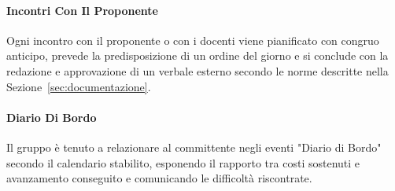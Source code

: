 \paragraph{Incontri Con Il Proponente}
Ogni incontro con il proponente o con i docenti viene pianificato con congruo
anticipo, prevede la predisposizione di un ordine del giorno e si conclude con la
redazione e approvazione di un verbale esterno secondo le norme descritte nella
Sezione~\ref{sec:documentazione}.

\paragraph{Diario Di Bordo}
Il gruppo è tenuto a relazionare al committente negli eventi "Diario di Bordo"
secondo il calendario stabilito, esponendo il rapporto tra costi sostenuti e
avanzamento conseguito e comunicando le difficoltà riscontrate.